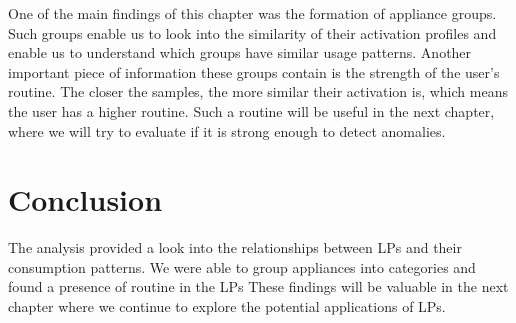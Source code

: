 One of the main findings of this chapter was the formation of appliance groups.
Such groups enable us to look into the similarity of their activation profiles and enable us to understand which groups have similar usage patterns.
Another important piece of information these groups contain is the strength of the user's routine.
The closer the samples, the more similar their activation is, which means the user has a higher routine.
Such a routine will be useful in the next chapter, where we will try to evaluate if it is strong enough to detect anomalies.

\section{Conclusion}

The analysis provided a look into the relationships between LPs and their consumption patterns.
We were able to group appliances into categories and found a presence of routine in the LPs
These findings will be valuable in the next chapter where we continue to explore the potential applications of LPs.

